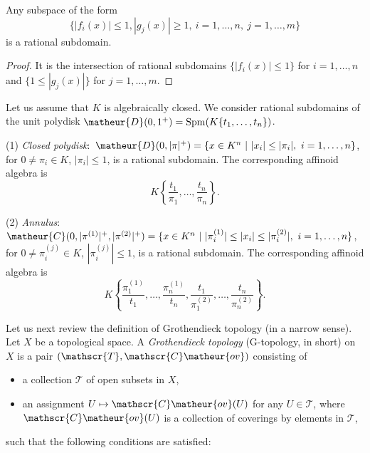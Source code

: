 \begin{appcor}\label{cor-rational-intersection}
Any subspace of the form
\begin{equation*}
 \{|f_i(x)|\leq 1,|g_j(x)|\geq 1,\ i=1,\ldots,n,\ j=1,\ldots,m\}
\end{equation*}
is a rational subdomain.
\end{appcor}

\begin{proof}
It is the intersection of rational subdomains
$\{|f_i(x)|\leq 1\}$ for $i=1,\ldots,n$ and
$\{1\leq |g_j(x)|\}$ for $j=1,\ldots,m$.
\end{proof}

\begin{appexa}
Let us assume that $K$ is algebraically closed.
We consider rational subdomains of the unit polydisk
$\matheur{D}(0,1^{+})=\mathrm{Spm}(K\{t_1,\ldots,t_n\})$.

(1) {\it Closed polydisk}:\  
$\matheur{D}(0,|\pi|^{+})=\{x\in K^n\ |\ |x_i|\leq |\pi_i|,\ 
i=1,\ldots,n\}$,
for $0\neq\pi_i\in K$, $|\pi_i|\leq 1$, is a rational subdomain. 
The corresponding affinoid algebra is 
$$
K\left\{\frac{t_1}{\pi_1},\ldots,\frac{t_n}{\pi_n}\right\}.
$$

(2) {\it Annulus}:\ 
$\matheur{C}(0,|\pi^{(1)}|^{+},|\pi^{(2)}|^{+})=
\{x\in K^n\ |\ |\pi^{(1)}_i|\leq |x_i|\leq
|\pi^{(2)}_i|,\ i=1,\ldots,n\}$, 
for $0\neq\pi^{(j)}_i\in K$, $|\pi^{(j)}_i|\leq 1$, is a rational 
subdomain. The corresponding affinoid algebra is 
$$
K\left\{\frac{\pi^{(1)}_1}{t_1},\ldots,\frac{\pi^{(1)}_n}{t_n},
\frac{t_1}{\pi^{(2)}_1},\ldots,\frac{t_n}{\pi^{(2)}_n}\right\}.
$$
\end{appexa}

Let us next review the definition of Grothendieck topology
(in a narrow sense). Let $X$ be a topological space.
A {\it Grothendieck topology} (G-topology, in short) on $X$ is a pair 
$(\mathscr{T},\mathscr{C}\matheur{ov})$ consisting of
\begin{itemize}
\item a collection $\mathscr{T}$ of open subsets in $X$,
\item an assignment $U\mapsto\mathscr{C}\matheur{ov}(U)$ for any $U\in\mathscr{T}$,
where $\mathscr{C}\matheur{ov}(U)$ is a collection of coverings by elements in
$\mathscr{T}$,
\end{itemize}

\noindent
such that the following conditions are satisfied:

